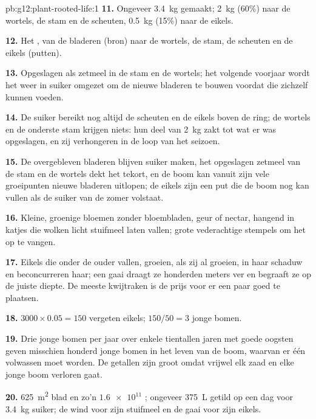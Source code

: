 \begin{solution}{pb:g12:plant-rooted-life:1}
\textbf{11.} Ongeveer \qty{3.4}{kg} gemaakt; \qty{2}{kg} (60\%) naar de
wortels, de stam en de scheuten, \qty{0.5}{kg} (15\%) naar de eikels.

\textbf{12.} Het , van de bladeren (bron) naar de wortels, de stam,
de scheuten en de eikels (putten).

\textbf{13.} Opgeslagen als zetmeel in de stam en de wortels; het volgende
voorjaar wordt het weer in suiker omgezet om de nieuwe bladeren te bouwen
voordat die zichzelf kunnen voeden.

\textbf{14.} De suiker bereikt nog altijd de scheuten en de eikels boven
de ring; de wortels en de onderste stam krijgen niets: hun deel van
\qty{2}{kg} zakt tot wat er was opgeslagen, en zij verhongeren in de loop
van het seizoen.

\textbf{15.} De overgebleven bladeren blijven suiker maken, het
opgeslagen zetmeel van de stam en de wortels dekt het tekort, en de boom
kan vanuit zijn vele groeipunten nieuwe bladeren uitlopen; de eikels zijn
een put die de boom nog kan vullen als de suiker van de zomer volstaat.

\textbf{16.} Kleine, groenige bloemen zonder bloembladen, geur of nectar,
hangend in katjes die wolken licht stuifmeel laten vallen; grote
vederachtige stempels om het op te vangen.

\textbf{17.} Eikels die onder de ouder vallen, groeien, als zij al
groeien, in haar schaduw en beconcurreren haar; een gaai draagt ze
honderden meters ver en begraaft ze op de juiste diepte. De meeste
kwijtraken is de prijs voor er een paar goed te plaatsen.

\textbf{18.} $3000 \times 0.05 = 150$ vergeten eikels; $150/50 = 3$ jonge
bomen.

\textbf{19.} Drie jonge bomen per jaar over enkele tientallen jaren met
goede oogsten geven misschien honderd jonge bomen in het leven van de
boom, waarvan er één volwassen moet worden. De getallen zijn groot omdat
vrijwel elk zaad en elke jonge boom verloren gaat.

\textbf{20.} \qty{625}{m^2} blad en zo'n $\num{1.6e11}$ ;
ongeveer \qty{375}{L} getild op een dag voor \qty{3.4}{kg} suiker; de wind
voor zijn stuifmeel en de gaai voor zijn eikels.
\end{solution}
